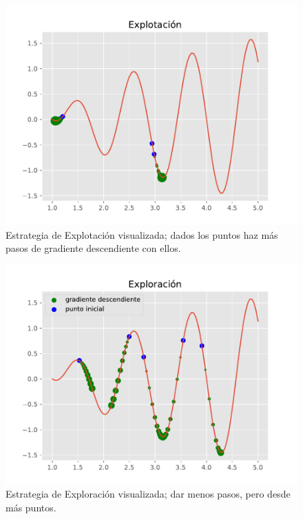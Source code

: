 \begin{figure}[H]
    \centering
    \includegraphics[width=\textwidth]{Figuras/explotacion.pdf}
    \caption[Explotación]{Estrategia de Explotación visualizada; dados los puntos haz más pasos de gradiente descendiente con ellos.}
    \label{fig:explotacion}
\end{figure}

\begin{figure}[H]
    \centering
    \includegraphics[width=\textwidth]{Figuras/exploracion.pdf}
    \caption[Exploración]{Estrategia de Exploración visualizada; dar menos pasos, pero desde más puntos.}
    \label{fig:exploracion}
\end{figure}

